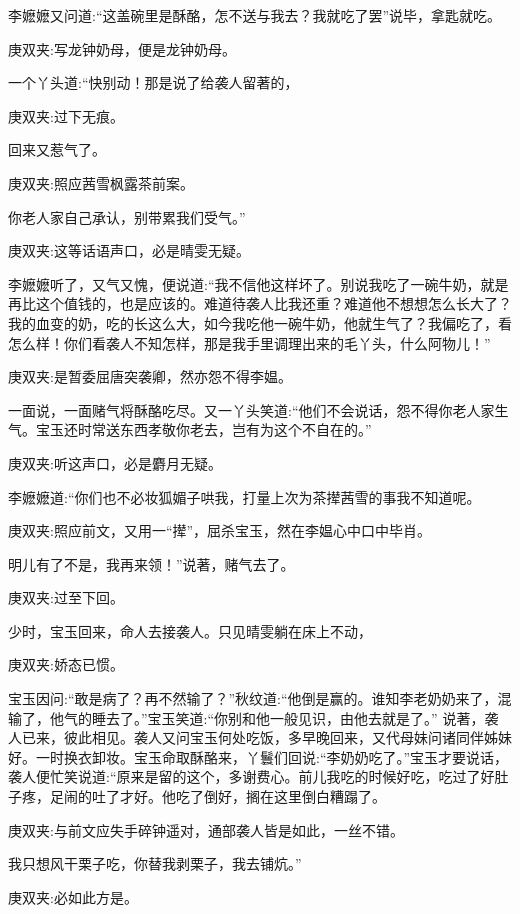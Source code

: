 \begin{parag}
    李嬷嬷又问道:“这盖碗里是酥酪，怎不送与我去？我就吃了罢”说毕，拿匙就吃。\begin{note}庚双夹:写龙钟奶母，便是龙钟奶母。\end{note}一个丫头道:“快别动！那是说了给袭人留著的，\begin{note}庚双夹:过下无痕。\end{note}回来又惹气了。\begin{note}庚双夹:照应茜雪枫露茶前案。\end{note}你老人家自己承认，别带累我们受气。”\begin{note}庚双夹:这等话语声口，必是晴雯无疑。\end{note}李嬷嬷听了，又气又愧，便说道:“我不信他这样坏了。别说我吃了一碗牛奶，就是再比这个值钱的，也是应该的。难道待袭人比我还重？难道他不想想怎么长大了？我的血变的奶，吃的长这么大，如今我吃他一碗牛奶，他就生气了？我偏吃了，看怎么样！你们看袭人不知怎样，那是我手里调理出来的毛丫头，什么阿物儿！”\begin{note}庚双夹:是暂委屈唐突袭卿，然亦怨不得李媪。\end{note}一面说，一面赌气将酥酪吃尽。又一丫头笑道:“他们不会说话，怨不得你老人家生气。宝玉还时常送东西孝敬你老去，岂有为这个不自在的。”\begin{note}庚双夹:听这声口，必是麝月无疑。\end{note}李嬷嬷道:“你们也不必妆狐媚子哄我，打量上次为茶撵茜雪的事我不知道呢。\begin{note}庚双夹:照应前文，又用一“撵”，屈杀宝玉，然在李媪心中口中毕肖。\end{note}明儿有了不是，我再来领！”说著，赌气去了。\begin{note}庚双夹:过至下回。\end{note}
\end{parag}


\begin{parag}
    少时，宝玉回来，命人去接袭人。只见晴雯躺在床上不动，\begin{note}庚双夹:娇态已惯。\end{note}宝玉因问:“敢是病了？再不然输了？”秋纹道:“他倒是赢的。谁知李老奶奶来了，混输了，他气的睡去了。”宝玉笑道:“你别和他一般见识，由他去就是了。” 说著，袭人已来，彼此相见。袭人又问宝玉何处吃饭，多早晚回来，又代母妹问诸同伴姊妹好。一时换衣卸妆。宝玉命取酥酪来，丫鬟们回说:“李奶奶吃了。”宝玉才要说话，袭人便忙笑说道:“原来是留的这个，多谢费心。前儿我吃的时候好吃，吃过了好肚子疼，足闹的吐了才好。他吃了倒好，搁在这里倒白糟蹋了。\begin{note}庚双夹:与前文应失手碎钟遥对，通部袭人皆是如此，一丝不错。\end{note}我只想风干栗子吃，你替我剥栗子，我去铺炕。”\begin{note}庚双夹:必如此方是。\end{note}
\end{parag}


